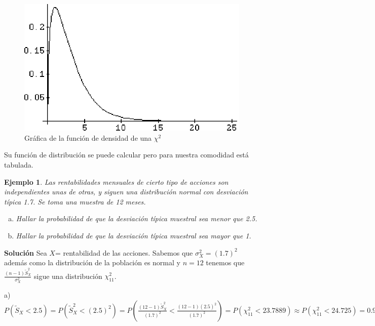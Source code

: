 \documentclass[12pt]{report}
\newtheorem{example}[definition]{Ejemplo}
\begin{document}
\begin{figure}

\begin{center}
\includegraphics[scale=0.6]{chi2.eps}
\end{center}
\caption{Gráfica de la función de densidad de una $\chi^2$}
\end{figure}



Su función de distribución se puede calcular pero para nuestra comodidad está tabulada.


    \begin{example}

     Las rentabilidades mensuales de cierto tipo de
        acciones son independientes unas de otras, y siguen una
        distribución normal con desviación típica 1.7. Se toma una
        muestra de 12 meses.
        \begin{enumerate}[a)]
            \item Hallar la probabilidad de que la desviación típica muestral
            sea menor que 2.5.
            \item Hallar la probabilidad de que la desviación típica
            muestral sea mayor que 1.
            \end{enumerate}
            \end{example}


    \textbf{Solución}
Sea $X$= rentabilidad de las acciones. Sabemos que $\sigma_{X}^2=(1.7)^2$ además como la
distribución de la población es normal y $n=12$  tenemos que
$\frac{(n-1)\tilde{S}_{X}^2}{\sigma_{X}^2}$ sigue  una distribución $\chi^2_{11}$.

a) $P(\tilde{S}_{X}<2.5)=
P(\tilde{S}_{X}^2<(2.5)^2)=P(\frac{(12-1)\tilde{S}_{X}^2}{(1.7)^2}<\frac{(12-1)
(2.5)^2}{(1.7)^2})= P(\chi_{11}^2<23.7889)\approx P(\chi_{11}^2<24.725)=0.99.$
\end{document}
